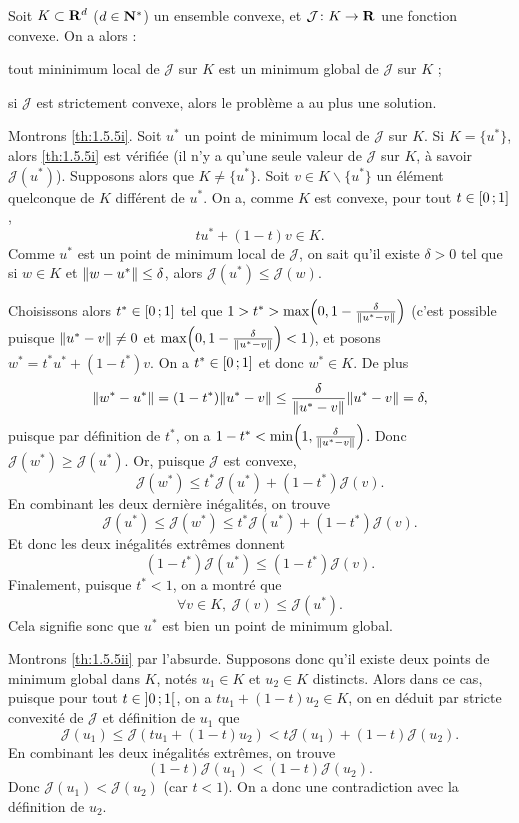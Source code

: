 \documentclass[grape]{../ceri/sty/MasterNotes}
\newcommand\J{\mathcal J}
\begin{document}
\begin{theo}\label{th:1.5.5}
    Soit $K\subset\mathbf{R}^d$ ($d\in\mathbf{N}^*$) un ensemble convexe, et $\J\colon K\to\R$ une fonction convexe. On a alors :
    \begin{subth}
        \item\label{th:1.5.5i} tout mininimum local de $\J$ sur $K$ est un minimum global de $\J$ sur $K$ ;
        \item\label{th:1.5.5ii} si $\J$ est strictement convexe, alors le problème a au plus une solution.
    \end{subth}
\end{theo}

\begin{demo}
    Montrons \ref{th:1.5.5i}. Soit $u^*$ un point de minimum local de $\J$ sur $K$. Si $K=\{u^*\}$, alors \ref{th:1.5.5i} est vérifiée (il n'y a qu'une seule valeur de $\J$ sur $K$, à savoir $\J(u^*)$). Supposons alors que $K\ne\{u^*\}$. Soit $v\in K\backslash\{u^*\}$ un élément quelconque de $K$ différent de $u^*$. On a, comme $K$ est convexe, pour tout $t\in\intff 01$,
    \[ tu^* + (1-t)v\in K. \]
    Comme $u^*$ est un point de minimum local de $\J$, on sait qu'il existe $\delta>0$ tel que si $w\in K$ et $\norme{w-u^*}\le\delta$, alors $\J(u^*)\le\J(w)$.

    Choisissons alors $t^*\in\intff 01$ tel que $1>t^*>\max\left(0, 1-\frac{\delta}{\norme{u^*-v}}\right)$ (c'est possible puisque $\norme{u^*-v}\ne 0$ et $\max\left(0, 1-\frac{\delta}{\norme{u^*-v}}\right)<1$), et posons $w^*=t^*u^* + (1-t^*)v$. On a $t^*\in\intff 01$ et donc $w^*\in K$. De plus
    \[ \norme{w^*-u^*}=(1-t^*)\norme{u^*-v}\le\frac{\delta}{\norme{u^*-v}}\norme{u^*-v}=\delta, \]
    puisque par définition de $t^*$, on a $1-t^*<\min\left( 1,\frac{\delta}{\norme{u^*-v}} \right)$. Donc $\J(w^*)\ge\J(u^*)$. Or, puisque $\J$ est convexe,
    \[ \J(w^*)\le t^*\J(u^*) + (1-t^*)\J(v). \]
    En combinant les deux dernière inégalités, on trouve
    \[ \J(u^*)\le\J(w^*)\le t^*\J(u^*) + (1-t^*)\J(v). \]
    Et donc les deux inégalités extrêmes donnent
    \[ (1-t^*)\J(u^*)\le (1-t^*)\J(v). \]
    Finalement, puisque $t^*<1$, on a montré que
    \[ \forall v\in K,\ \J(v)\le\J(u^*). \]
    Cela signifie sonc que $u^*$ est bien un point de minimum global.

    Montrons \ref{th:1.5.5ii} par l'absurde. Supposons donc qu'il existe deux points de minimum global dans $K$, notés $u_1\in K$ et $u_2\in K$ distincts. Alors dans ce cas, puisque pour tout $t\in\intoo 01$, on a $tu_1+(1-t)u_2\in K$, on en déduit par stricte convexité de $\J$ et définition de $u_1$ que
    \[ \J(u_1)\le\J(tu_1 + (1-t)u_2) < t\J(u_1) + (1-t)\J(u_2). \]
    En combinant les deux inégalités extrêmes, on trouve
    \[ (1-t)\J(u_1) < (1-t)\J(u_2). \]
    Donc $\J(u_1)<\J(u_2)$ (car $t<1$). On a donc une contradiction avec la définition de $u_2$.
\end{demo}
\end{document}
